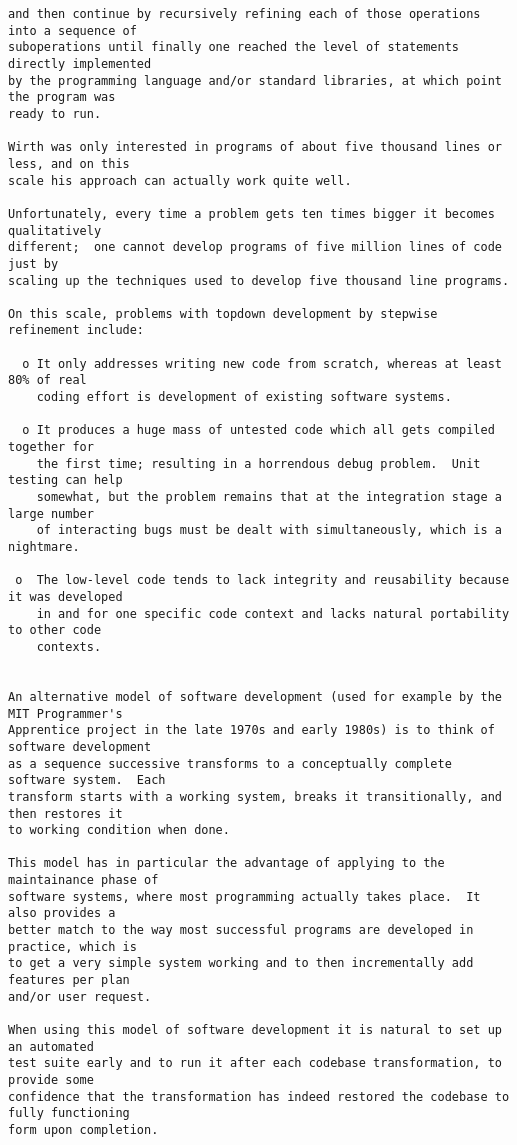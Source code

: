 \begin{verbatim}
and then continue by recursively refining each of those operations into a sequence of
suboperations until finally one reached the level of statements directly implemented
by the programming language and/or standard libraries, at which point the program was
ready to run.

Wirth was only interested in programs of about five thousand lines or less, and on this
scale his approach can actually work quite well.

Unfortunately, every time a problem gets ten times bigger it becomes qualitatively
different;  one cannot develop programs of five million lines of code just by
scaling up the techniques used to develop five thousand line programs.

On this scale, problems with topdown development by stepwise refinement include:

  o It only addresses writing new code from scratch, whereas at least 80% of real
    coding effort is development of existing software systems.

  o It produces a huge mass of untested code which all gets compiled together for
    the first time; resulting in a horrendous debug problem.  Unit testing can help
    somewhat, but the problem remains that at the integration stage a large number
    of interacting bugs must be dealt with simultaneously, which is a nightmare.

 o  The low-level code tends to lack integrity and reusability because it was developed
    in and for one specific code context and lacks natural portability to other code
    contexts.


An alternative model of software development (used for example by the MIT Programmer's
Apprentice project in the late 1970s and early 1980s) is to think of software development
as a sequence successive transforms to a conceptually complete software system.  Each
transform starts with a working system, breaks it transitionally, and then restores it
to working condition when done.

This model has in particular the advantage of applying to the maintainance phase of
software systems, where most programming actually takes place.  It also provides a
better match to the way most successful programs are developed in practice, which is
to get a very simple system working and to then incrementally add features per plan
and/or user request.

When using this model of software development it is natural to set up an automated
test suite early and to run it after each codebase transformation, to provide some
confidence that the transformation has indeed restored the codebase to fully functioning
form upon completion.


\end{verbatim}
